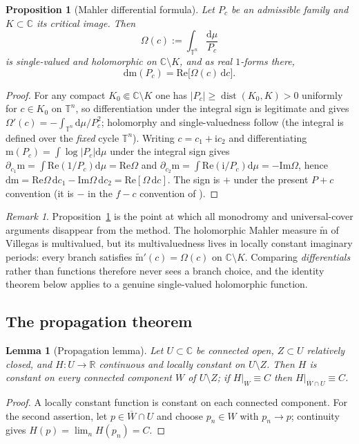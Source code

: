 \documentclass[11pt]{article}
\newcommand{\m}{\mathrm{m}}                 %
\newcommand{\mt}{\widetilde{\mathrm{m}}}    %
\newcommand{\Cc}{\mathbb{C}}
\newcommand{\Rr}{\mathbb{R}}
\newcommand{\Tt}{\mathbb{T}}
\newcommand{\ii}{\mathrm{i}}
\newcommand{\id}{\mathrm{d}}
\newcommand{\ReT}{\mathrm{Re}}
\newcommand{\ImT}{\mathrm{Im}}
\DeclareMathOperator{\dist}{dist}
\newtheorem{lemma}[theorem]{Lemma}
\newtheorem{proposition}[theorem]{Proposition}
\theoremstyle{definition}
\theoremstyle{remark}
\newtheorem{remark}[theorem]{Remark}
\begin{document}
\begin{proposition}[Mahler differential formula]\label{prop:mahlerdiff}
Let $P_c$ be an admissible family and $K\subset\Cc$ its critical image.
Then
\[
  \Omega(c):=\int_{\Tt^n}\frac{\id\mu}{P_c}
\]
is single-valued and holomorphic on $\Cc\setminus K$, and as real
$1$-forms there,
\begin{equation}\label{eq:dm}
  \id\m(P_c)=\ReT\bigl[\Omega(c)\,\id c\bigr].
\end{equation}
\end{proposition}
\begin{proof}
For any compact $K_0\Subset\Cc\setminus K$ one has
$|P_c|\ge\dist(K_0,K)>0$ uniformly for $c\in K_0$ on $\Tt^n$, so
differentiation under the integral sign is legitimate and gives
$\Omega'(c)=-\int_{\Tt^n}\id\mu/P_c^2$; holomorphy and
single-valuedness follow (the integral is defined over the
\emph{fixed} cycle $\Tt^n$). Writing $c=c_1+\ii c_2$ and
differentiating $\m(P_c)=\int\log|P_c|\id\mu$ under the integral
sign gives
$\partial_{c_1}\m=\int\ReT(1/P_c)\id\mu=\ReT\Omega$ and
$\partial_{c_2}\m=\int\ReT(\ii/P_c)\id\mu=-\ImT\Omega$, hence
$\id\m=\ReT\Omega\,\id c_1-\ImT\Omega\,\id c_2
=\ReT[\Omega\,\id c]$. The sign is $+$ under the present $P+c$
convention (it is $-$ in the $f-c$ convention of
\cite[Lemma~2.7]{Zf}).
\end{proof}

\begin{remark}\label{rem:monodromy}
Proposition~\ref{prop:mahlerdiff} is the point at which all
monodromy and universal-cover arguments disappear from the method.
The holomorphic Mahler measure $\mt$ of Villegas \cite{RV} is
multivalued, but its multivaluedness lives in locally constant
imaginary periods: every branch satisfies $\mt'(c)=\Omega(c)$ on
$\Cc\setminus K$. Comparing \emph{differentials} rather than
functions therefore never sees a branch choice, and the identity
theorem below applies to a genuine single-valued holomorphic
function.
\end{remark}

\subsection{The propagation theorem}\label{subsec:prop}

\begin{lemma}[Propagation lemma]\label{lem:prop}
Let $U\subset\Cc$ be connected open, $Z\subset U$ relatively closed,
and $H:U\to\Rr$ continuous and locally constant on $U\setminus Z$.
Then $H$ is constant on every connected component $W$ of
$U\setminus Z$; if $H|_W\equiv C$ then
$H|_{\overline W\cap U}\equiv C$.
\end{lemma}
\begin{proof}
A locally constant function is constant on each connected component.
For the second assertion, let $p\in\overline{W}\cap U$ and choose
$p_n\in W$ with $p_n\to p$; continuity gives $H(p)=\lim_n H(p_n)=C$.
\end{proof}
\end{document}
